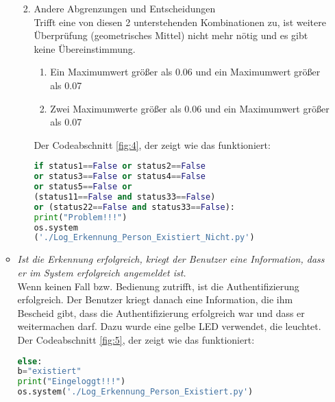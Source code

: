 \begin{enumerate}
\begin{itemize}
\begin{enumerate}
\begin{enumerate}
		\end{enumerate} 
	
		\item Andere Abgrenzungen und Entscheidungen \\
		
		Trifft eine von diesen 2 unterstehenden Kombinationen zu, ist weitere Überprüfung (geometrisches Mittel) nicht mehr nötig und es gibt keine Übereinstimmung.
		\begin{enumerate}
			\item Ein Maximumwert größer als 0.06 und ein Maximumwert größer als 0.07 \\
			\item Zwei Maximumwerte größer als 0.06 und ein Maximumwert größer als 0.07 \\
		\end{enumerate}
	
		Der Codeabschnitt \ref{fig:4}, der zeigt wie das funktioniert:\\
		
\begin{lstlisting}[caption={Andere Abgrenzungen und Entscheidungen},label={fig:4}, language=Python]
if status1==False or status2==False 
or status3==False or status4==False 
or status5==False or
(status11==False and status33==False) 
or (status22==False and status33==False):
print("Problem!!!")
os.system
('./Log_Erkennung_Person_Existiert_Nicht.py')
\end{lstlisting}
		
	\end{enumerate}
\item \textit{Ist die Erkennung erfolgreich, kriegt der Benutzer eine Information, dass er im System erfolgreich angemeldet ist.} \\

Wenn keinen Fall bzw. Bedienung zutrifft, ist die Authentifizierung erfolgreich. Der Benutzer kriegt danach eine Information, die ihm Bescheid gibt, dass die Authentifizierung erfolgreich war und dass er weitermachen darf. Dazu wurde eine gelbe LED verwendet, die leuchtet. \\	

Der Codeabschnitt \ref{fig:5}, der zeigt wie das funktioniert:\\

\begin{lstlisting}[caption={Erkennung ist erfolgreich},label={fig:5}, language=Python]
else:
b="existiert"
print("Eingeloggt!!!")
os.system('./Log_Erkennung_Person_Existiert.py')
\end{lstlisting}

\end{itemize}
\end{enumerate}
